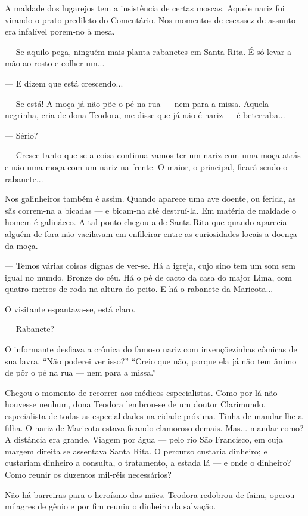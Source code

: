 A maldade dos lugarejos tem a insistência de certas moscas. Aquele nariz
foi virando o prato predileto do Comentário. Nos momentos de escassez de
assunto era infalível porem-no à mesa.

--- Se aquilo pega, ninguém mais planta rabanetes em Santa Rita. É só
levar a mão ao rosto e colher um...

--- E dizem que está crescendo...

--- Se está! A moça já não põe o pé na rua --- nem para a missa. Aquela
negrinha, cria de dona Teodora, me disse que já não é nariz --- é
beterraba...

--- Sério?

--- Cresce tanto que se a coisa continua vamos ter um nariz com uma moça
atrás e não uma moça com um nariz na frente. O maior, o principal,
ficará sendo o rabanete...

Nos galinheiros também é assim. Quando aparece uma ave doente, ou
ferida, as sãs correm-na a bicadas --- e bicam-na até destruí-la. Em
matéria de maldade o homem é galináceo. A tal ponto chegou a de Santa
Rita que quando aparecia alguém de fora não vacilavam em enfileirar
entre as curiosidades locais a doença da moça.

--- Temos várias coisas dignas de ver-se. Há a igreja, cujo sino tem um
som sem igual no mundo. Bronze do céu. Há o pé de cacto da casa do major
Lima, com quatro metros de roda na altura do peito. E há o rabanete da
Maricota...

O visitante espantava-se, está claro.

--- Rabanete?

O informante desfiava a crônica do famoso nariz com invençõezinhas
cômicas de sua lavra. ``Não poderei ver isso?'' ``Creio que não, porque
ela já não tem ânimo de pôr o pé na rua --- nem para a missa.''

Chegou o momento de recorrer aos médicos especialistas. Como por lá não
houvesse nenhum, dona Teodora lembrou-se de um doutor Clarimundo,
especialista de todas as especialidades na cidade próxima. Tinha de
mandar-lhe a filha. O nariz de Maricota estava ficando clamoroso demais.
Mas... mandar como? A distância era grande. Viagem por água --- pelo rio
São Francisco, em cuja margem direita se assentava Santa Rita. O
percurso custaria dinheiro; e custariam dinheiro a consulta, o
tratamento, a estada lá --- e onde o dinheiro? Como reunir os duzentos
mil-réis necessários?

Não há barreiras para o heroísmo das mães. Teodora redobrou de faina,
operou milagres de gênio e por fim reuniu o dinheiro da salvação.

